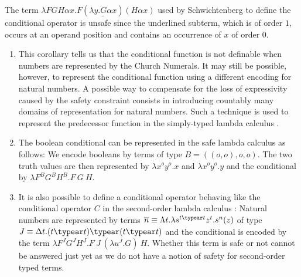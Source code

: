 \begin{example}
The term $\lambda F G H \alpha x . F ( \underline{\lambda y . G
\alpha x} ) (H \alpha x)$ used by Schwichtenberg
\cite{citeulike:622637} to define the conditional operator is unsafe
since the underlined subterm, which is of order $1$, occurs at an
operand position and contains an occurrence of $x$ of order $0$.
\end{example}

\begin{remark} \hfill
\begin{enumerate}
\item This corollary tells us that the conditional function is not
definable when numbers are represented by the Church Numerals.
It may still be possible, however, to represent the conditional
function using a different encoding for natural numbers. A
possible way to compensate for the loss of expressivity caused
by the safety constraint consists in introducing countably many
domains of representation for natural numbers. Such
a technique is used to represent the predecessor function in
the simply-typed lambda calculus
\cite{DBLP:journals/jacm/FortuneLO83}.

\item The boolean conditional can be represented in the safe
lambda calculus as follows: We encode booleans by terms of type
$B=((o,o),o,o)$. The two truth values are then represented by
$\lambda x^o y^o.x$ and $\lambda x^o y^o.y$ and the conditional by
$\lambda F^B G^B H^B . F~G~H$.

\item It is also possible to define a conditional operator behaving like
the conditional operator $C$ in the second-order lambda calculus
\cite{DBLP:journals/jacm/FortuneLO83}: Natural numbers are
represented by terms $\overline{n} \equiv \Lambda t.\lambda
s^{t\typear t} z^t.s^n(z)$ of type $J \equiv \Delta t.(t\typear
t) \typear (t \typear t)$ and the conditional is encoded by the
term $\lambda F^J G^J H^J.F~J~(\lambda u^J . G)~H$. Whether this
term is safe or not cannot be answered just yet as we do not
have a notion of safety for second-order typed terms.
\end{enumerate}
\end{remark}





\newcommand{\zaioncencode}{\underline} %

\newcommand{\zaiwordtyp}{\mathbf{B}} %
\newcommand{\closedof}[1]{{\rm Cl}(#1)} %

